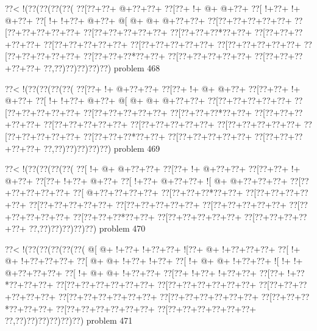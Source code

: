 \vbox{\vbox{\goo
\0??<\- !(\0??(\0??(\0??(\0??(
\0??[\0??+\0??+\- @+\0??+\0??+
\0??[\0??+\- !+\- @+\- @+\0??+
\0??[\- !+\0??+\- !+\- @+\0??+
\0??[\- !+\- !+\0??+\- @+\0??+
\- @[\- @+\- @+\- @+\0??+\0??+
\0??[\0??+\0??+\0??+\0??+\0??+
\0??[\0??+\0??+\0??+\0??+\0??+
\0??[\0??+\0??+\0??+\0??+\0??+
\0??[\0??+\0??+\0??*\0??+\0??+
\0??[\0??+\0??+\0??+\0??+\0??+
\0??[\0??+\0??+\0??+\0??+\0??+
\0??[\0??+\0??+\0??+\0??+\0??+
\0??[\0??+\0??+\0??+\0??+\0??+
\0??[\0??+\0??+\0??+\0??+\0??+
\0??[\0??+\0??+\0??*\0??+\0??+
\0??[\0??+\0??+\0??+\0??+\0??+
\0??[\0??+\0??+\0??+\0??+\0??+
\0??,\0??)\0??)\0??)\0??)\0??)
}
\hfil problem 468\hfil\break
}

\vbox{\vbox{\goo
\0??<\- !(\0??(\0??(\0??(\0??(
\0??[\0??+\- !+\- @+\0??+\0??+
\0??[\0??+\- !+\- @+\- @+\0??+
\0??[\0??+\0??+\- !+\- @+\0??+
\0??[\- !+\- !+\0??+\- @+\0??+
\- @[\- @+\- @+\- @+\0??+\0??+
\0??[\0??+\0??+\0??+\0??+\0??+
\0??[\0??+\0??+\0??+\0??+\0??+
\0??[\0??+\0??+\0??+\0??+\0??+
\0??[\0??+\0??+\0??*\0??+\0??+
\0??[\0??+\0??+\0??+\0??+\0??+
\0??[\0??+\0??+\0??+\0??+\0??+
\0??[\0??+\0??+\0??+\0??+\0??+
\0??[\0??+\0??+\0??+\0??+\0??+
\0??[\0??+\0??+\0??+\0??+\0??+
\0??[\0??+\0??+\0??*\0??+\0??+
\0??[\0??+\0??+\0??+\0??+\0??+
\0??[\0??+\0??+\0??+\0??+\0??+
\0??,\0??)\0??)\0??)\0??)\0??)
}
\hfil problem 469\hfil\break
}

\vbox{\vbox{\goo
\0??<\- !(\0??(\0??(\0??(\0??(
\0??[\- !+\- @+\- @+\0??+\0??+
\0??[\0??+\- !+\- @+\0??+\0??+
\0??[\0??+\0??+\- !+\- @+\0??+
\0??[\0??+\- !+\0??+\- @+\0??+
\0??[\- !+\0??+\- @+\0??+\0??+
\- ![\- @+\- @+\0??+\0??+\0??+
\0??[\0??+\0??+\0??+\0??+\0??+
\0??[\- @+\0??+\0??+\0??+\0??+
\0??[\0??+\0??+\0??*\0??+\0??+
\0??[\0??+\0??+\0??+\0??+\0??+
\0??[\0??+\0??+\0??+\0??+\0??+
\0??[\0??+\0??+\0??+\0??+\0??+
\0??[\0??+\0??+\0??+\0??+\0??+
\0??[\0??+\0??+\0??+\0??+\0??+
\0??[\0??+\0??+\0??*\0??+\0??+
\0??[\0??+\0??+\0??+\0??+\0??+
\0??[\0??+\0??+\0??+\0??+\0??+
\0??,\0??)\0??)\0??)\0??)\0??)
}
\hfil problem 470\hfil\break
}

\vbox{\vbox{\goo
\0??<\- !(\0??(\0??(\0??(\0??(\0??(
\- @[\- @+\- !+\0??+\- !+\0??+\0??+
\- ![\0??+\- @+\- !+\0??+\0??+\0??+
\0??[\- !+\- @+\- !+\0??+\0??+\0??+
\0??[\- @+\- @+\- !+\0??+\- !+\0??+
\0??[\- !+\- @+\- @+\- !+\0??+\0??+
\- ![\- !+\- !+\- @+\0??+\0??+\0??+
\0??[\- !+\- @+\- @+\- !+\0??+\0??+
\0??[\0??+\- !+\0??+\- !+\0??+\0??+
\0??[\0??+\- !+\0??*\0??+\0??+\0??+
\0??[\0??+\0??+\0??+\0??+\0??+\0??+
\0??[\0??+\0??+\0??+\0??+\0??+\0??+
\0??[\0??+\0??+\0??+\0??+\0??+\0??+
\0??[\0??+\0??+\0??+\0??+\0??+\0??+
\0??[\0??+\0??+\0??+\0??+\0??+\0??+
\0??[\0??+\0??+\0??*\0??+\0??+\0??+
\0??[\0??+\0??+\0??+\0??+\0??+\0??+
\0??[\0??+\0??+\0??+\0??+\0??+\0??+
\0??,\0??)\0??)\0??)\0??)\0??)\0??)
}
\hfil problem 471\hfil\break
}


